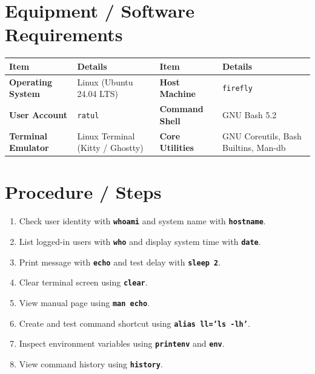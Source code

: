 \documentclass[10pt,a4paper]{article}
\newcommand{\cmd}[1]{\texttt{\textbf{#1}}}
\begin{document}
\section{Equipment / Software Requirements}
\vspace{-2pt}
\begin{table}[h!]
\centering\footnotesize
\renewcommand{\arraystretch}{1.08}
\begin{tabularx}{\linewidth}{lXlX}
\toprule
\textbf{Item} & \textbf{Details} & \textbf{Item} & \textbf{Details} \\
\midrule
\textbf{Operating System} & Linux (Ubuntu 24.04 LTS) & \textbf{Host Machine} & \texttt{firefly} \\
\textbf{User Account} & \texttt{ratul} & \textbf{Command Shell} & GNU Bash 5.2 \\
\textbf{Terminal Emulator} & Linux Terminal (Kitty / Ghostty) & \textbf{Core Utilities} & GNU Coreutils, Bash Builtins, Man-db \\
\bottomrule
\end{tabularx}
\end{table}
\vspace{-8pt}

\section{Procedure / Steps}
\begin{enumerate}[noitemsep,topsep=1pt,leftmargin=1.4em]
  \item Check user identity with \cmd{whoami} and system name with \cmd{hostname}.
  \item List logged-in users with \cmd{who} and display system time with \cmd{date}.
  \item Print message with \cmd{echo} and test delay with \cmd{sleep 2}.
  \item Clear terminal screen using \cmd{clear}.
  \item View manual page using \cmd{man echo}.
  \item Create and test command shortcut using \cmd{alias ll='ls -lh'}.
  \item Inspect environment variables using \cmd{printenv} and \cmd{env}.
  \item View command history using \cmd{history}.
\end{enumerate}
\end{document}
